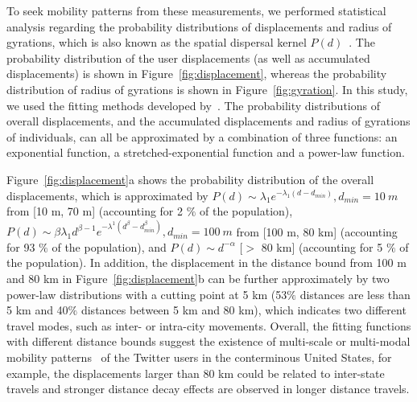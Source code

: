 \documentclass[ijgi,article,accept,moreauthors,pdftex,10pt,a4paper]{mdpi}
\theoremstyle{mdpi}
\newcounter{ex}
\newcounter{re}
\theoremstyle{mdpidefinition}
\begin{document}
To seek mobility patterns from these measurements, we performed statistical analysis regarding the probability distributions of displacements and radius of gyrations, which is also known as the spatial dispersal kernel $P(d)$~\cite{brockmann2006scaling}.
The probability distribution of the user displacements (as well as accumulated displacements) is shown in Figure~\ref{fig:displacement}, whereas the probability distribution of radius of gyrations is shown in Figure~\ref{fig:gyration}. 
In this study, we used the fitting methods developed by~\cite{Jurdak2015}.
The probability distributions of overall displacements, and the accumulated displacements and radius of gyrations of individuals, can all be approximated by a combination of three functions: an exponential function, a stretched-exponential function and a power-law function.

Figure~\ref{fig:displacement}a shows the probability distribution of the overall displacements, which is approximated by $P(d) \sim \lambda_{1} e^{-\lambda_{1}(d - d_{min})}, d_{min}=10~m$ from [10 m, 70 m] (accounting for 2 $\%$ of the population), $ P(d) \sim \beta\lambda_{1}d^{\beta-1}e^{-\lambda^{1}(d^\beta-d_{min}^\beta)}, d_{min}=100~m$ from [100 m, 80 km] (accounting for 93 $\%$ of the population), and $P(d) \sim {d}^{-\alpha}$ [$>$ 80 km] (accounting for 5 $\%$ of the population).
In addition, the displacement in the distance bound from 100 m and 80 km in Figure~\ref{fig:displacement}b can be further approximately by two power-law distributions with a cutting point at 5 km (53$\%$ distances are less than 5 km and 40$\%$ distances between 5 km and 80 km), which indicates two different travel modes, such as inter- or intra-city movements.
Overall, the fitting functions with different distance bounds suggest the existence of multi-scale or multi-modal mobility patterns~\cite{Jurdak2015} of the Twitter users in the conterminous United States, for example, the displacements larger than 80 km could be related to inter-state travels and stronger distance decay effects are observed in longer distance travels. 
\end{document}

